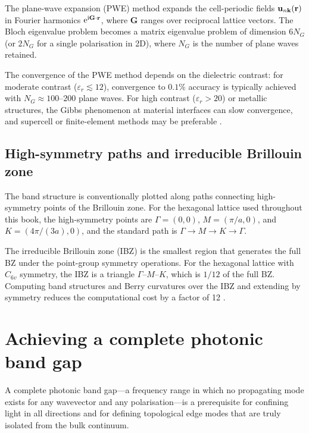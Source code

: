 The plane-wave expansion (PWE) method expands the cell-periodic fields
$\mathbf{u}_{n\mathbf{k}}(\mathbf{r})$ in Fourier harmonics
$\mathrm{e}^{\mathrm{i}\mathbf{G}\cdot\mathbf{r}}$, where $\mathbf{G}$ ranges over
reciprocal lattice vectors.  The Bloch eigenvalue problem becomes a
matrix eigenvalue problem of dimension $6N_G$ (or $2N_G$ for a single
polarisation in 2D), where $N_G$ is the number of plane waves
retained.

The convergence of the PWE method depends on the dielectric contrast:
for moderate contrast ($\varepsilon_r\lesssim 12$), convergence to
$0.1\%$ accuracy is typically achieved with $N_G\approx 100$--$200$
plane waves.  For high contrast ($\varepsilon_r>20$) or metallic
structures, the Gibbs phenomenon at material interfaces can slow
convergence, and supercell or finite-element methods may be preferable
\cite{ozawa2018topological,haldane2008possible}.

\subsection{High-symmetry paths and irreducible Brillouin zone}
\label{sec:ch4-high-symmetry}

The band structure is conventionally plotted along paths connecting
high-symmetry points of the Brillouin zone.  For the hexagonal
lattice used throughout this book, the high-symmetry points are
$\Gamma=(0,0)$, $M=(\pi/a,0)$, and $K=(4\pi/(3a),0)$, and the
standard path is $\Gamma\to M\to K\to\Gamma$.

The irreducible Brillouin zone (IBZ) is the smallest region that
generates the full BZ under the point-group symmetry operations.
For the hexagonal lattice with $C_{6v}$ symmetry, the IBZ is a
triangle $\Gamma$--$M$--$K$, which is $1/12$ of the full BZ.
Computing band structures and Berry curvatures over the IBZ and
extending by symmetry reduces the computational cost by a factor of
12 \cite{price2022roadmap,gangaraj2016berry}.

\section{Achieving a complete photonic band gap}
\label{sec:ch4-complete-gap-conditions}

A complete photonic band gap---a frequency range in which no
propagating mode exists for any wavevector and any polarisation---is
a prerequisite for confining light in all directions and for defining
topological edge modes that are truly isolated from the bulk
continuum.

